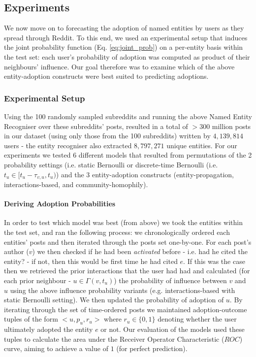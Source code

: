 \documentclass[10pt,journal,compsoc]{IEEEtran}
\begin{document}
\subsection{Experiments}
We now move on to forecasting the adoption of named entities by users as they spread through Reddit.
To this end, we used an experimental setup that induces the joint probability function (Eq. \ref{eq:joint_prob}) on a per-entity basis within the test set: each user's probability of adoption was computed as product of their neighbours' influence.
Our goal therefore was to examine which of the above entity-adoption constructs were best suited to predicting adoptions.

\subsubsection{Experimental Setup}
Using the 100 randomly sampled subreddits and running the above Named Entity Recogniser over these subreddits' posts, resulted in a total of $>300$ million posts in our dataset (using only those from the 100 subreddits) written by $4,139,814$ users - the entity recogniser also extracted $8,797,271$ unique entities.
For our experiments we tested 6 different models that resulted from permutations of the 2 probability settings (i.e. static Bernoulli or discrete-time Bernoulli (i.e. $t_u \in [t_u - \tau_{v,u}, t_u)$) and the 3 entity-adoption constructs (entity-propagation, interactions-based, and community-homophily).

\paragraph{Deriving Adoption Probabilities}
In order to test which model was best (from above) we took the entities within the test set, and ran the following process: we chronologically ordered each entities' posts and then iterated through the posts set one-by-one.
For each post's author ($v$) we then checked if he had been \emph{activated} before - i.e. had he cited the entity? - if not, then this would be first time he had cited $e$.
If this was the case then we retrieved the prior interactions that the user had had and calculated (for each prior neighbour - $u \in \Gamma(v, t_u)$) the probability of influence between $v$ and $u$ using the above influence probability variants (e.g. interactions-based with static Bernoulli setting).
We then updated the probability of adoption of $u$.
By iterating through the set of time-ordered posts we maintained adoption-outcome tuples of the form $<u, p_u, r_u>$ where $r_u \in \{0,1\}$ denoting whether the user ultimately adopted the entity $e$ or not.
Our evaluation of the models used these tuples to calculate the area under the Receiver Operator Characteristic ($ROC$) curve, aiming to achieve a value of $1$ (for perfect prediction).
\end{document}
